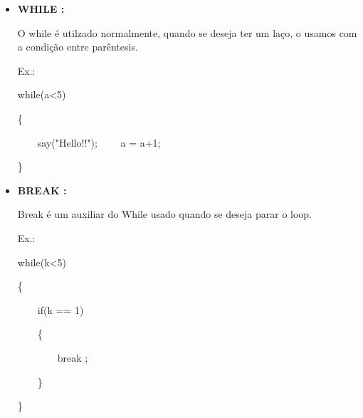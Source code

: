 \documentclass[a4paper]{article}
\begin{document}
{{{{\begin{itemize}
            \ \ \ \  say("a é maior");
            
            \}
            
            \textcolor{NavyBlue}{elsif(a == b)}
            
            \{
            
            \ \ \ \ say("a é igual a b");
            
            \}
            
            \textcolor{NavyBlue}{else}
            
            \{
            
            \ \ \ \  say("a é menor a b");
            
            \}
    
        \bigskip    
            
        \item \textbf{WHILE :}
            
            O while é utilzado normalmente, quando se
            deseja ter um laço, o usamos com a condição
            entre parêntesis.
        
            \textcolor{NavyBlue}{Ex.:}
            
            \textcolor{NavyBlue}{while(a<5)}
            
            \{
            
            \ \ \ \  say("Hello!!");
            \ \ \ \  a = a+1;
            
            \}
        
        \bigskip
            
        \item \textbf{BREAK :}
            
            Break é um auxiliar do While usado quando se 
            deseja parar o loop.
            
            \textcolor{NavyBlue}{Ex.:}
            
            while(k<5)
            
            \{
            
            \ \ \ \ if(k == 1)
              
            \ \ \ \ \{
              
            \ \ \ \ \ \ \ \ \textcolor{NavyBlue}{break}
                    ;
              
            \ \ \ \ \}
           
            \}
        

\end{itemize}}}}}
\end{document}
